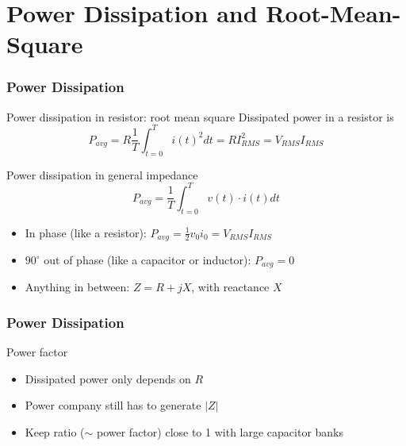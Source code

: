 \documentclass[beamer]{standalone}
\begin{document}
\section{Power Dissipation and Root-Mean-Square}
\begin{frame}
 \frametitle{Power Dissipation}
 \begin{block}{Power dissipation in resistor: root mean square}
  Dissipated power in a resistor is 
  \begin{equation*}
   P_{avg} = R \frac{1}{T} \int_{t=0}^T i(t)^2 dt = R I_{RMS}^2 = V_{RMS} I_{RMS}
  \end{equation*}
 \end{block}
 \begin{block}{Power dissipation in general impedance}
  \begin{equation*}
   P_{avg} = \frac{1}{T} \int_{t=0}^T v(t) \cdot i(t) dt
  \end{equation*}
  \begin{itemize}
   \item In phase (like a resistor): $P_{avg} = \frac{1}{2} v_0 i_0 = V_{RMS} I_{RMS}$
   \item $90^\circ$ out of phase (like a capacitor or inductor): $P_{avg} = 0$
   \item Anything in between: $Z = R + j X$, with reactance $X$
  \end{itemize}
 \end{block}
\end{frame}
\begin{frame}
 \frametitle{Power Dissipation}
 \begin{block}{Power factor}
  \begin{itemize}
   \item Dissipated power only depends on $R$
   \item Power company still has to generate $|Z|$
   \item Keep ratio ($\sim$ power factor) close to 1 with large capacitor banks
  \end{itemize}
 \end{block}
 \begin{center}
 \end{center}
\end{frame}
\end{document}

